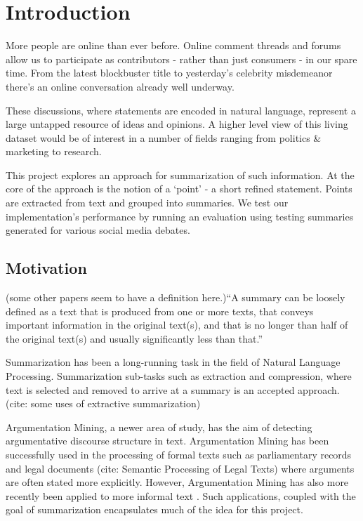 \chapter{Introduction\label{chap:introduction}}
  More people are online than ever before. Online comment threads and forums allow us to participate as contributors - rather than just consumers - in our spare time. From the latest blockbuster title to yesterday's celebrity misdemeanor there's an online conversation already well underway.

  These discussions, where statements are encoded in natural language, represent a large untapped resource of ideas and opinions. A higher level view of this living dataset would be of interest in a number of fields ranging from politics \& marketing to research.

  This project explores an approach for summarization of such information. At the core of the approach is the notion of a `point' - a short refined statement. Points are extracted from text and grouped into summaries. We test our implementation's performance by running an evaluation using testing summaries generated for various social media debates.

  \section{Motivation}
    (some other papers seem to have a definition here.)``A summary can be loosely defined as a text that is produced from one or more texts, that conveys important information in the original text(s), and that is no longer than half of the original text(s) and usually significantly less than that.'' \cite{radev2002introduction}

    Summarization has been a long-running task in the field of Natural Language Processing. Summarization sub-tasks such as extraction and compression, where text is selected and removed to arrive at a summary is an accepted approach. (cite: some uses of extractive summarization)

    Argumentation Mining, a newer area of study, has the aim of detecting argumentative discourse structure in text. Argumentation Mining has been successfully used in the processing of formal texts such as parliamentary records \cite{palau2009argumentation} and legal documents (cite: Semantic Processing of Legal Texts) where arguments are often stated more explicitly. However, Argumentation Mining has also more recently been applied to more informal text \cite{park2015conditional}. Such applications, coupled with the goal of summarization encapsulates much of the idea for this project.

